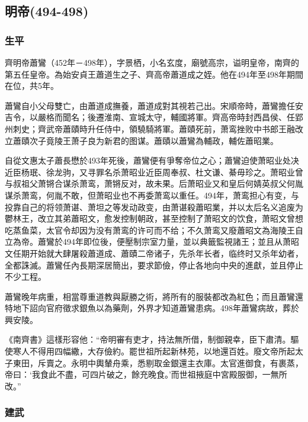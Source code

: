 
\subsection{明帝\tiny(494-498)}

\subsubsection{生平}

齊明帝蕭鸞（452年－498年），字景栖，小名玄度，廟號高宗，谥明皇帝，南齊的第五任皇帝。為始安貞王蕭道生之子、齊高帝蕭道成之姪。他在494年至498年期間在位，共5年。

蕭鸞自小父母雙亡，由蕭道成撫養，蕭道成對其視若己出。宋順帝時，蕭鸞擔任安吉令，以嚴格而聞名；後遷淮南、宣城太守，輔國將軍。齊高帝時封西昌侯、任郢州刺史；齊武帝蕭賾時升任侍中，領驍騎將軍。蕭賾死前，萧鸾挫败中书郎王融改立蕭賾次子竟陵王萧子良为新君的图谋。蕭賾以蕭鸞為輔政，輔佐蕭昭業。

自從文惠太子蕭長懋於493年死後，蕭鸞便有爭奪帝位之心；蕭鸞迫使萧昭业处决近臣杨珉、徐龙驹，又寻罪名杀萧昭业近臣周奉叔、杜文谦、綦毋珍之。萧昭业曾与叔祖父萧锵合谋杀萧鸾，萧锵反对，故未果。后萧昭业又和皇后何婧英叔父何胤谋杀萧鸾，何胤不敢，但萧昭业也不再委萧鸾以重任。494年，萧鸾担心有变，与投靠自己的将领萧谌、萧坦之等发动政变，由萧谌殺蕭昭業，并以太后名义追废为鬱林王，改立其弟蕭昭文，愈发控制朝政，甚至控制了萧昭文的饮食，萧昭文曾想吃蒸鱼菜，太官令却因为没有萧鸾的许可而不给；不久萧鸾又廢蕭昭文為海陵王自立為帝。蕭鸞於494年即位後，便壓制宗室力量，並以典籤監視諸王；並且从萧昭文任期开始就大肆屠殺蕭道成、蕭賾二帝诸子，先杀年长者，临终时又杀年幼者，全都誅滅。蕭鸞任內長期深居簡出，要求節儉，停止各地向中央的進獻，並且停止不少工程。

蕭鸞晚年病重，相當尊重道教與厭勝之術，將所有的服裝都改為紅色；而且蕭鸞還特地下詔向官府徵求銀魚以為藥劑，外界才知道蕭鸞患病。498年蕭鸞病故，葬於興安陵。

《南齊書》這樣形容他：“帝明審有吏才，持法無所借，制御親幸，臣下肅清。驅使寒人不得用四幅繖，大存儉約。罷世祖所起新林苑，以地還百姓。廢文帝所起太子東田，斥賣之。永明中輿輦舟乘，悉剔取金銀還主衣庫。太官進御食，有裹蒸，帝曰：‘我食此不盡，可四片破之，餘充晚食。’而世祖掖庭中宮殿服御，一無所改。”

\subsubsection{建武}


